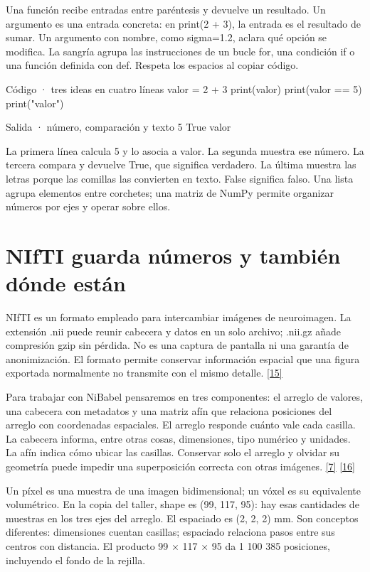 Una función recibe entradas entre paréntesis y devuelve un resultado. Un argumento es una entrada concreta: en print(2 + 3), la entrada es el resultado de sumar. Un argumento con nombre, como sigma=1.2, aclara qué opción se modifica. La sangría agrupa las instrucciones de un bucle for, una condición if o una función definida con def. Respeta los espacios al copiar código.


\begin{Codigo}{Código · tres ideas en cuatro líneas}
valor = 2 + 3
print(valor)
print(valor == 5)
print("valor")
\end{Codigo}

\begin{Salida}{Salida · número, comparación y texto}
5
True
valor
\end{Salida}

La primera línea calcula 5 y lo asocia a valor. La segunda muestra ese número. La tercera compara y devuelve True, que significa verdadero. La última muestra las letras porque las comillas las convierten en texto. False significa falso. Una lista agrupa elementos entre corchetes; una matriz de NumPy permite organizar números por ejes y operar sobre ellos.


\section{NIfTI guarda números y también dónde están}

NIfTI es un formato empleado para intercambiar imágenes de neuroimagen. La extensión .nii puede reunir cabecera y datos en un solo archivo; .nii.gz añade compresión gzip sin pérdida. No es una captura de pantalla ni una garantía de anonimización. El formato permite conservar información espacial que una figura exportada normalmente no transmite con el mismo detalle. \hyperlink{refR15}{[15]}


Para trabajar con NiBabel pensaremos en tres componentes: el arreglo de valores, una cabecera con metadatos y una matriz afín que relaciona posiciones del arreglo con coordenadas espaciales. El arreglo responde cuánto vale cada casilla. La cabecera informa, entre otras cosas, dimensiones, tipo numérico y unidades. La afín indica cómo ubicar las casillas. Conservar solo el arreglo y olvidar su geometría puede impedir una superposición correcta con otras imágenes. \hyperlink{refR7}{[7]} \hyperlink{refR16}{[16]}


Un píxel es una muestra de una imagen bidimensional; un vóxel es su equivalente volumétrico. En la copia del taller, shape es (99, 117, 95): hay esas cantidades de muestras en los tres ejes del arreglo. El espaciado es (2, 2, 2) mm. Son conceptos diferentes: dimensiones cuentan casillas; espaciado relaciona pasos entre sus centros con distancia. El producto 99 × 117 × 95 da 1 100 385 posiciones, incluyendo el fondo de la rejilla.


